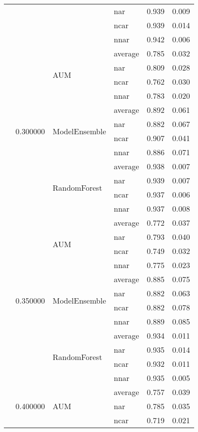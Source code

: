 \begin{longtable}{llllrr}
 &  &  & nar & 0.939 & 0.009 \\
 &  &  & ncar & 0.939 & 0.014 \\
 &  &  & nnar & 0.942 & 0.006 \\
\cline{2-6} \cline{3-6}
 & \multirow[t]{12}{*}{0.300000} & \multirow[t]{4}{*}{AUM} & average & 0.785 & 0.032 \\
 &  &  & nar & 0.809 & 0.028 \\
 &  &  & ncar & 0.762 & 0.030 \\
 &  &  & nnar & 0.783 & 0.020 \\
\cline{3-6}
 &  & \multirow[t]{4}{*}{ModelEnsemble} & average & 0.892 & 0.061 \\
 &  &  & nar & 0.882 & 0.067 \\
 &  &  & ncar & 0.907 & 0.041 \\
 &  &  & nnar & 0.886 & 0.071 \\
\cline{3-6}
 &  & \multirow[t]{4}{*}{RandomForest} & average & 0.938 & 0.007 \\
 &  &  & nar & 0.939 & 0.007 \\
 &  &  & ncar & 0.937 & 0.006 \\
 &  &  & nnar & 0.937 & 0.008 \\
\cline{2-6} \cline{3-6}
 & \multirow[t]{12}{*}{0.350000} & \multirow[t]{4}{*}{AUM} & average & 0.772 & 0.037 \\
 &  &  & nar & 0.793 & 0.040 \\
 &  &  & ncar & 0.749 & 0.032 \\
 &  &  & nnar & 0.775 & 0.023 \\
\cline{3-6}
 &  & \multirow[t]{4}{*}{ModelEnsemble} & average & 0.885 & 0.075 \\
 &  &  & nar & 0.882 & 0.063 \\
 &  &  & ncar & 0.882 & 0.078 \\
 &  &  & nnar & 0.889 & 0.085 \\
\cline{3-6}
 &  & \multirow[t]{4}{*}{RandomForest} & average & 0.934 & 0.011 \\
 &  &  & nar & 0.935 & 0.014 \\
 &  &  & ncar & 0.932 & 0.011 \\
 &  &  & nnar & 0.935 & 0.005 \\
\cline{2-6} \cline{3-6}
 & \multirow[t]{12}{*}{0.400000} & \multirow[t]{4}{*}{AUM} & average & 0.757 & 0.039 \\
 &  &  & nar & 0.785 & 0.035 \\
 &  &  & ncar & 0.719 & 0.021 \\

\end{longtable}
